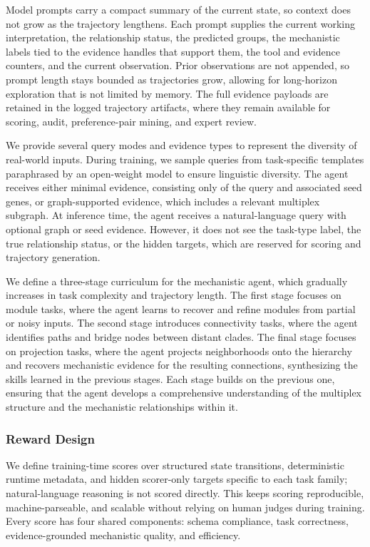 \documentclass[thesis,letterpaper,12pt]{utthesis}
\begin{document}
Model prompts carry a compact summary of the current state, so context does not grow as the trajectory lengthens. Each prompt supplies the current working interpretation, the relationship status, the predicted groups, the mechanistic labels tied to the evidence handles that support them, the tool and evidence counters, and the current observation. Prior observations are not appended, so prompt length stays bounded as trajectories grow, allowing for long-horizon exploration that is not limited by memory. The full evidence payloads are retained in the logged trajectory artifacts, where they remain available for scoring, audit, preference-pair mining, and expert review.

We provide several query modes and evidence types to represent the diversity of real-world inputs. During training, we sample queries from task-specific templates paraphrased by an open-weight model to ensure linguistic diversity. The agent receives either minimal evidence, consisting only of the query and associated seed genes, or graph-supported evidence, which includes a relevant multiplex subgraph. At inference time, the agent receives a natural-language query with optional graph or seed evidence. However, it does not see the task-type label, the true relationship status, or the hidden targets, which are reserved for scoring and trajectory generation.

We define a three-stage curriculum for the mechanistic agent, which gradually increases in task complexity and trajectory length. The first stage focuses on module tasks, where the agent learns to recover and refine modules from partial or noisy inputs. The second stage introduces connectivity tasks, where the agent identifies paths and bridge nodes between distant clades. The final stage focuses on projection tasks, where the agent projects neighborhoods onto the hierarchy and recovers mechanistic evidence for the resulting connections, synthesizing the skills learned in the previous stages. Each stage builds on the previous one, ensuring that the agent develops a comprehensive understanding of the multiplex structure and the mechanistic relationships within it.

\subsubsection{Reward Design}\label{sec:ch4-reward}
We define training-time scores over structured state transitions, deterministic runtime metadata, and hidden scorer-only targets specific to each task family; natural-language reasoning is not scored directly. This keeps scoring reproducible, machine-parseable, and scalable without relying on human judges during training. Every score has four shared components: schema compliance, task correctness, evidence-grounded mechanistic quality, and efficiency.
\end{document}

